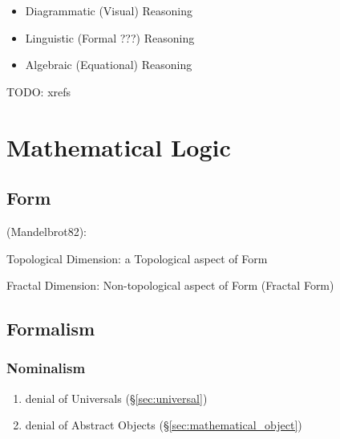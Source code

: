 \begin{itemize}
  \item Diagrammatic (Visual) Reasoning
  \item Linguistic (Formal ???) Reasoning
  \item Algebraic (Equational) Reasoning
\end{itemize}

TODO: xrefs



\section{Mathematical Logic}\label{sec:mathematical_logic}
\cite{curry77}

\subsection{Form}\label{sec:form}

(Mandelbrot82):

Topological Dimension: a Topological aspect of Form

Fractal Dimension: Non-topological aspect of Form (Fractal Form)



\subsection{Formalism}\label{sec:formalism}

\subsubsection{Nominalism}\label{sec:nominalism}

\begin{enumerate}
  \item denial of Universals (\S\ref{sec:universal})
  \item denial of Abstract Objects (\S\ref{sec:mathematical_object})
\end{enumerate}



